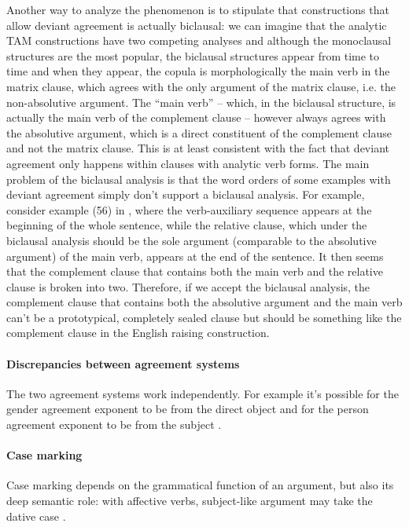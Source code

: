 \documentclass[a4paper, oneside, 12pt]{report}
\newcommand*{\citetable}[1]{Table~{#1}}
\newcommand*{\citepage}[1]{p.~{#1}}
\begin{document}
Another way to analyze the phenomenon is to stipulate that 
constructions that allow deviant agreement is actually biclausal: 
we can imagine that the analytic TAM constructions have two competing analyses 
and although the monoclausal structures are the most popular, 
the biclausal structures appear from time to time 
and when they appear, the copula is morphologically the main verb in the matrix clause,
which agrees with the only argument of the matrix clause, 
i.e. the non-absolutive argument.
The ``main verb'' -- which, in the biclausal structure, is actually the main verb of the complement clause -- 
however always agrees with the absolutive argument, 
which is a direct constituent of the complement clause and not the matrix clause.
This is at least consistent with the fact that deviant agreement only happens within clauses with analytic verb forms.
The main problem of the biclausal analysis is that the word orders of some examples with deviant agreement 
simply don't support a biclausal analysis.
For example, consider example (56) in \citep[\citepage{385}]{forker2020grammar}, 
where the verb-auxiliary sequence appears at the beginning of the whole sentence, 
while the relative clause, 
which under the biclausal analysis should be the sole argument (comparable to the absolutive argument) of the main verb, 
appears at the end of the sentence.
It then seems that the complement clause that contains 
both the main verb and the relative clause is broken into two.
Therefore, if we accept the biclausal analysis, 
the complement clause that contains both the absolutive argument and the main verb 
can't be a prototypical, completely sealed clause 
but should be something like the complement clause in the English raising construction.

\paragraph*{Discrepancies between agreement systems} 
The two agreement systems work independently.
For example it's possible for the gender agreement exponent to be from the direct object 
and for the person agreement exponent to be from the subject
\citep[\citepage{400}, (108)]{forker2020grammar}.

\paragraph*{Case marking} 
Case marking depends on the grammatical function of an argument, 
but also its deep semantic role: 
with affective verbs, subject-like argument may take the dative case 
\citep[\citetable{19.1}]{forker2020grammar}. 
\end{document}
